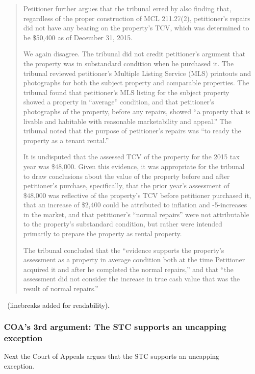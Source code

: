 \documentclass[12pt,\documentclassflag]{michiganCourtOfAppealsBrief}
\begin{document}
\begin{quotation}
  Petitioner further argues that the tribunal erred by also finding that, regardless of the proper
construction of MCL 211.27(2), petitioner's repairs did not have any bearing on the property's
TCV, which was determined to be \$50,400 as of December 31, 2015.

We again disagree. The
tribunal did not credit petitioner's argument that the property was in substandard condition when
he purchased it. The tribunal reviewed petitioner's Multiple Listing Service (MLS) printouts and
photographs for both the subject property and comparable properties. The tribunal found that
petitioner's MLS listing for the subject property showed a property in ``average'' condition, and
that petitioner's photographs of the property, before any repairs, showed ``a property that is livable
and habitable with reasonable marketability and appeal.'' The tribunal noted that the purpose of
petitioner's repairs was ``to ready the property as a tenant rental.''

It is undisputed that the assessed
TCV of the property for the 2015 tax year was \$48,000. Given this evidence, it was appropriate
for the tribunal to draw conclusions about the value of the property before and after petitioner's
purchase, specifically, that the prior year's assessment of \$48,000 was reflective of the property's
TCV before petitioner purchased it, that an increase of \$2,400 could be attributed to inflation and
-5-increases in the market, and that petitioner's ``normal repairs'' were not attributable to the
property's substandard condition, but rather were intended primarily to prepare the property as
rental property.

The tribunal concluded that the ``evidence supports the property's assessment as
a property in average condition both at the time Petitioner acquired it and after he completed the
normal repairs,'' and that ``the assessment did not consider the increase in true cash value that was
the result of normal repairs.''
\end{quotation}
\ (linebreaks added for readability).

\subsubsection{COA's 3rd argument: The STC supports an uncapping exception}

Next the Court of Appeals argues that the STC supports an uncapping exception.
\end{document}
